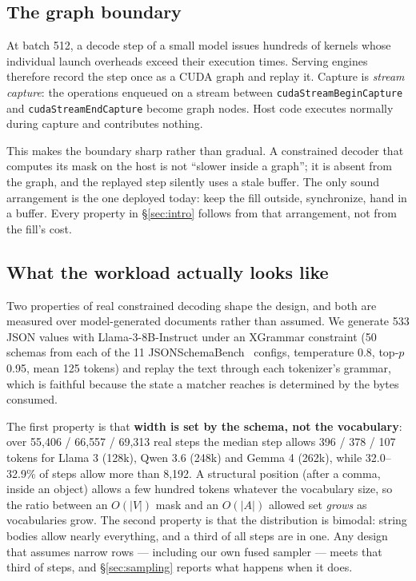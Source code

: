 \documentclass{article}
\begin{document}
\subsection{The graph boundary}

At batch 512, a decode step of a small model issues hundreds of kernels whose
individual launch overheads exceed their execution times. Serving engines
therefore record the step once as a CUDA graph and replay it. Capture is
\emph{stream capture}: the operations enqueued on a stream between
\texttt{cudaStreamBeginCapture} and \texttt{cudaStreamEndCapture} become graph
nodes. Host code executes normally during capture and contributes nothing.

This makes the boundary sharp rather than gradual. A constrained decoder that
computes its mask on the host is not ``slower inside a graph''; it is absent
from the graph, and the replayed step silently uses a stale buffer. The only
sound arrangement is the one deployed today: keep the fill outside, synchronize,
hand in a buffer. Every property in \S\ref{sec:intro} follows from that
arrangement, not from the fill's cost.

\subsection{What the workload actually looks like}

Two properties of real constrained decoding shape the design, and both are
measured over model-generated documents rather than assumed. We generate 533
JSON values with Llama-3-8B-Instruct under an XGrammar constraint (50 schemas
from each of the 11 JSONSchemaBench~\cite{geng2025jsonschemabench} configs,
temperature 0.8, top-$p$ 0.95, mean 125 tokens) and replay the text through
each tokenizer's grammar, which is faithful because the state a matcher reaches
is determined by the bytes consumed.

The first property is that \textbf{width is set by the schema, not the
vocabulary}: over 55{,}406 / 66{,}557 / 69{,}313 real steps the median step
allows 396 / 378 / 107 tokens for Llama 3 (128k), Qwen 3.6 (248k) and Gemma 4
(262k), while 32.0--32.9\% of steps allow more than 8{,}192. A structural position (after a comma, inside an
object) allows a few hundred tokens whatever the vocabulary size, so the ratio
between an $O(|V|)$ mask and an $O(|A|)$ allowed set \emph{grows} as vocabularies
grow. The second property is that the distribution is bimodal: string bodies
allow nearly everything, and a third of all steps are in one. Any design that
assumes narrow rows --- including our own fused sampler --- meets that third of
steps, and \S\ref{sec:sampling} reports what happens when it does.
\end{document}
